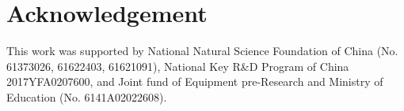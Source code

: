 \documentclass[acmsmall]{acmart}
\begin{document}
\maketitle

\renewcommand{\shortauthors}{K. Guo et al.}
\newcommand{\rev}[1]{{\color[rgb]{0,0,1}{#1}}}



















\section*{Acknowledgement}
This work was supported by National Natural Science Foundation of China (No.  61373026, 61622403, 61621091), National Key R\&D Program of China 2017YFA0207600, and Joint fund of Equipment pre-Research and Ministry of Education (No. 6141A02022608).



\end{document}
